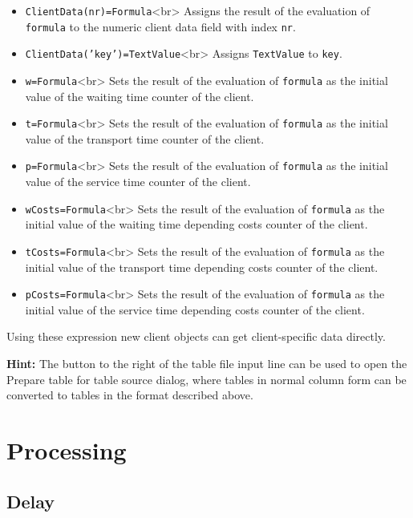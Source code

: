 \begin{itemize}
  \item \texttt{ClientData(nr)=Formula}<br>
  Assigns the result of the evaluation of \texttt{formula} to the numeric
  client data field with index \texttt{nr}. 
  \item \texttt{ClientData('key')=TextValue}<br>
  Assigns \texttt{TextValue} to \texttt{key}. 
  \item \texttt{w=Formula}<br>
  Sets the result of the evaluation of \texttt{formula} as the
  initial value of the waiting time counter of the client.   
  \item \texttt{t=Formula}<br>
  Sets the result of the evaluation of \texttt{formula} as the
  initial value of the transport time counter of the client.   
  \item \texttt{p=Formula}<br>
  Sets the result of the evaluation of \texttt{formula} as the
  initial value of the service time counter of the client. 
  \item \texttt{wCosts=Formula}<br>
  Sets the result of the evaluation of \texttt{formula} as the
  initial value of the waiting time depending costs counter of the client. 
  \item \texttt{tCosts=Formula}<br>
  Sets the result of the evaluation of \texttt{formula} as the
  initial value of the transport time depending costs counter of the client. 
  \item \texttt{pCosts=Formula}<br>
  Sets the result of the evaluation of \texttt{formula} as the
  initial value of the service time depending costs counter of the client. 
\end{itemize}

Using these expression new client objects can get client-specific data directly. 

\textbf{Hint:}
The button to the right of the table file input line can be used to open the 
Prepare table for table source dialog,
where tables in normal column form can be converted to tables in the format described above.





\chapter{Processing}

\section{Delay}
\label{ref:ModelElementDelay}

